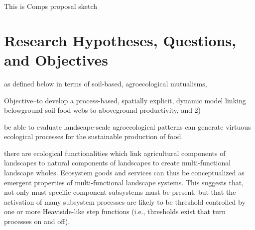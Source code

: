 This is Comps proposal sketch


\section{Research Hypotheses, Questions, and Objectives}
as defined below in terms of soil-based, agroecological mutualisms,

Objective--to develop a process-based, spatially explicit, dynamic model linking belowground soil food webs to aboveground productivity, and 2) 

be able to evaluate landscape-scale agroecological patterns can generate virtuous ecological processes for the sustainable production of food. 


there are ecological functionalities which link agricultural components of landscapes to natural components of landscapes to create multi-functional landscape wholes. Ecosystem goods and services can thus be conceptualized as emergent properties of multi-functional landscape systems. This suggests that, not only must specific component subsystems must be present, but that the activation of many subsystem processes are likely to be threshold controlled by one or more Heaviside-like step functions (i.e., thresholds exist that turn processes on and off). 



